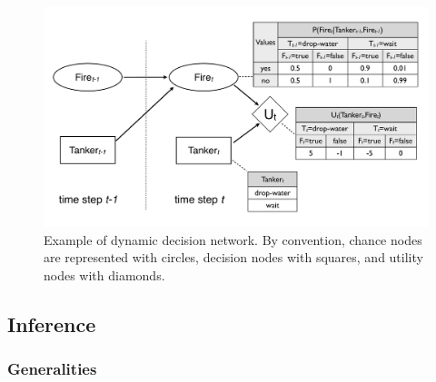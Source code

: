 \begin{figure}[h]
\centering
\includegraphics[scale=0.25]{imgs/ddn.pdf}
\caption{Example of dynamic decision network. By convention, chance nodes are represented with circles, decision nodes with squares, and utility nodes with diamonds. }
\label{fig:ddn}
\end{figure}


\subsection{Inference} 
\label{sec:inference}
\subsubsection*{Generalities}

